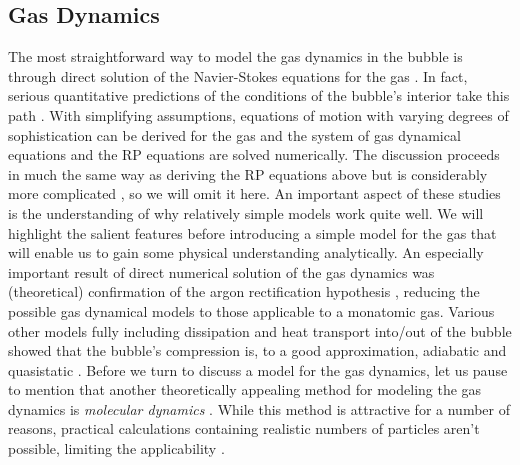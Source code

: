 \documentclass[rmp,aps,nofootinbib,superscriptaddress,floatfix]{revtex4-2}
\begin{document}
\subsection{Gas Dynamics}
The most straightforward way to model the gas dynamics in the bubble is through direct solution of the Navier-Stokes equations for the gas \cite{brenner2002single}. In fact, serious quantitative predictions of the conditions of the bubble's interior take this path \cite{an2006mechanism,an2008spectral,an2009diagnosing,flannigan2005plasma,flannigan2006measurement}. With simplifying assumptions, equations of motion with varying degrees of sophistication can be derived for the gas and the system of gas dynamical equations and the RP equations are solved numerically. The discussion proceeds in much the same way as deriving the RP equations above but is considerably more complicated \cite{brenner2002single,yasui2018acoustic}, so we will omit it here. An important aspect of these studies is the understanding of why relatively simple models work quite well. We will highlight the salient features before introducing a simple model for the gas that will enable us to gain some physical understanding analytically. An especially important result of direct numerical solution of the gas dynamics was (theoretical) confirmation of the argon rectification hypothesis \cite{}, reducing the possible gas dynamical models to those applicable to a monatomic gas. Various other models fully including dissipation and heat transport into/out of the bubble showed that the bubble's compression is, to a good approximation, adiabatic and quasistatic \cite{}. Before we turn to discuss a model for the gas dynamics, let us pause to mention that another theoretically appealing method for modeling the gas dynamics is \emph{molecular dynamics} \cite{}. While this method is attractive for a number of reasons, practical calculations containing realistic numbers of particles aren't possible, limiting the applicability \cite{brenner2002single}.
\end{document}
